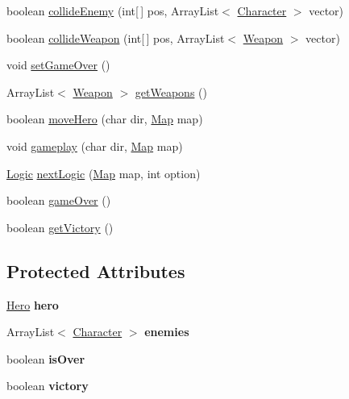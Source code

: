 \begin{DoxyCompactItemize}
\item 
boolean \hyperlink{classdkeep_1_1logic_1_1_logic_aa038077e7e65bd2d047a125c5a7e6185}{collide\+Enemy} (int\mbox{[}$\,$\mbox{]} pos, Array\+List$<$ \hyperlink{classdkeep_1_1logic_1_1_character}{Character} $>$ vector)
\item 
boolean \hyperlink{classdkeep_1_1logic_1_1_logic_a6205c4d1912a64443bd9e5743d2db3bb}{collide\+Weapon} (int\mbox{[}$\,$\mbox{]} pos, Array\+List$<$ \hyperlink{classdkeep_1_1logic_1_1_weapon}{Weapon} $>$ vector)
\item 
void \hyperlink{classdkeep_1_1logic_1_1_logic_a6f9b5655e854e6460900b165f3f5f17a}{set\+Game\+Over} ()
\item 
Array\+List$<$ \hyperlink{classdkeep_1_1logic_1_1_weapon}{Weapon} $>$ \hyperlink{classdkeep_1_1logic_1_1_logic_af58982bc364016e2d0e03a36440a99b4}{get\+Weapons} ()
\item 
boolean \hyperlink{classdkeep_1_1logic_1_1_logic_a90069e7aa3f72919105ee446842e44fa}{move\+Hero} (char dir, \hyperlink{classdkeep_1_1logic_1_1_map}{Map} map)
\item 
void \hyperlink{classdkeep_1_1logic_1_1_logic_a1917b8f625dfb7c50ed2a2075209ed1a}{gameplay} (char dir, \hyperlink{classdkeep_1_1logic_1_1_map}{Map} map)
\item 
\hyperlink{classdkeep_1_1logic_1_1_logic}{Logic} \hyperlink{classdkeep_1_1logic_1_1_logic_a2f6e65021a7b525a5c61ebe1a56f09db}{next\+Logic} (\hyperlink{classdkeep_1_1logic_1_1_map}{Map} map, int option)
\item 
boolean \hyperlink{classdkeep_1_1logic_1_1_logic_a36229f271b0682f9a68c31390b4759cb}{game\+Over} ()
\item 
boolean \hyperlink{classdkeep_1_1logic_1_1_logic_a8873eb8f5bcdd55d87fe1e9953da00e0}{get\+Victory} ()
\end{DoxyCompactItemize}
\subsection*{Protected Attributes}
\begin{DoxyCompactItemize}
\item 
\mbox{\label{classdkeep_1_1logic_1_1_logic_acf37fbec31325d4209c3127b9754b2e6}} 
\hyperlink{classdkeep_1_1logic_1_1_hero}{Hero} {\bfseries hero}
\item 
\mbox{\label{classdkeep_1_1logic_1_1_logic_a2a25bee4f951f296f9cea3bb29f6ba07}} 
Array\+List$<$ \hyperlink{classdkeep_1_1logic_1_1_character}{Character} $>$ {\bfseries enemies}
\item 
\mbox{\label{classdkeep_1_1logic_1_1_logic_affc85b490b04c1b96994acfdfdcc1b50}} 
boolean {\bfseries is\+Over}
\item 
\mbox{\label{classdkeep_1_1logic_1_1_logic_a66c6502b38114e5af23068cb0089bbb2}} 
boolean {\bfseries victory}
\end{DoxyCompactItemize}


